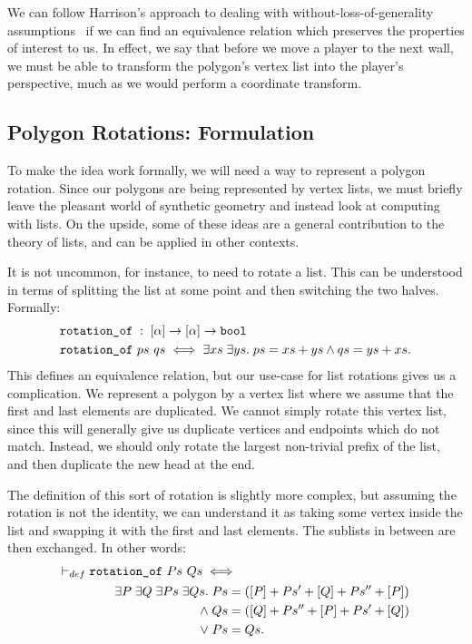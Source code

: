 We can follow Harrison's approach to dealing with without-loss-of-generality assumptions~\cite{HarrisonWLOG} if we can find an equivalence relation which preserves the properties of interest to us. In effect, we say that before we move a player to the next wall, we must be able to transform the polygon's vertex list into the player's perspective, much as we would perform a coordinate transform.

\subsection{Polygon Rotations: Formulation}\label{sec:PolygonRotation}
To make the idea work formally, we will need a way to represent a polygon rotation. Since our polygons are being represented by vertex lists, we must briefly leave the pleasant world of synthetic geometry and instead look at computing with lists. On the upside, some of these ideas are a general contribution to the theory of lists, and can be applied in other contexts. 

It is not uncommon, for instance, to need to rotate a list. This can be understood in terms of splitting the list at some point and then switching the two halves. Formally:
\begin{displaymath}
  \begin{split}
&\texttt{rotation\_of}\; :\; [\alpha] \rightarrow [\alpha] \rightarrow \texttt{bool}\\
&\texttt{rotation\_of}\ ps\ qs \iff \exists xs\;\exists ys.\; ps = xs + ys \wedge qs = ys + xs.\\
  \end{split}
\end{displaymath}
This defines an equivalence relation, but our use-case for list rotations gives us a complication. We represent a polygon by a vertex list where we assume that the first and last elements are duplicated. We cannot simply rotate this vertex list, since this will generally give us duplicate vertices and endpoints which do not match. Instead, we should only rotate the largest non-trivial prefix of the list, and then duplicate the new head at the end. 

The definition of this sort of rotation is slightly more complex, but assuming the rotation is not the identity, we can understand it as taking some vertex inside the list and swapping it with the first and last elements. The sublists in between are then exchanged. In other words:
\begin{align*}
    \vdash_{def}\;&\texttt{rotation\_of}\ Ps\ Qs \iff\\
    &\qquad\begin{aligned}
    \exists P\;\exists Q\;\exists Ps\;\exists Qs.\; Ps &= ([P] + Ps' + [Q] + Ps'' + [P])\\
    \wedge\; Qs &= ([Q] + Ps'' + [P] + Ps' + [Q])\\
    \vee\; Ps &= Qs.
  \end{aligned}
\end{align*}

